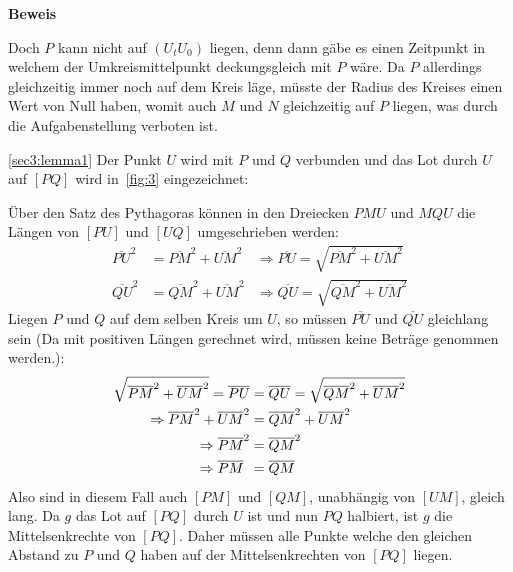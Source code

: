 \documentclass[10pt, a4paper, reqno]{amsart}
\makeatletter
\renewcommand\proofname{Beweis}
\renewenvironment{proof}[1][\proofname]{\par
\pushQED{\qed}%
\normalfont \topsep6\p@\@plus6\p@\relax
\trivlist
\item\relax
{\bfseries#1}\hspace\labelsep\ignorespaces
}{%
\popQED\endtrivlist\@endpefalse
}
\newenvironment{proof_thm}[1]{
\begin{proof}[\proofname~(#1)]}{\end{proof}}
\makeatother
\begin{document}
\begin{proof}
  Doch $P$ kann nicht auf $(U_tU_0)$ liegen, denn dann gäbe es
  einen Zeitpunkt in welchem der Umkreismittelpunkt deckungsgleich mit $P$ wäre.
  Da $P$ allerdings gleichzeitig immer noch auf dem Kreis läge, müsste der
  Radius des Kreises einen Wert von Null haben, womit auch $M$ und $N$
  gleichzeitig auf $P$ liegen, was durch die Aufgabenstellung verboten ist.
\end{proof}
\begin{proof_thm}{\autoref{sec3:lemma1}}
  Der Punkt $U$ wird mit $P$ und $Q$ verbunden und das Lot durch $U$ auf $[PQ]$
  wird in~\autoref{fig:3} eingezeichnet:
  \begin{figure}[h]
    \centering
    \caption{}
    \label{fig:3}
  \end{figure}
  Über den Satz des Pythagoras können in den Dreiecken $PMU$ und $MQU$ die Längen von $[PU]$ und $[UQ]$
  umgeschrieben werden:
  \begin{align*}
    \overline{PU}^2&=\overline{PM}^2+\overline{UM}^2 &\Rightarrow \overline{PU}=\sqrt{\overline{PM}^2+\overline{UM}^2}\\
    \overline{QU}^2&=\overline{QM}^2+\overline{UM}^2 &\Rightarrow \overline{QU}=\sqrt{\overline{QM}^2+\overline{UM}^2}
  \end{align*}
  Liegen $P$ und $Q$ auf dem selben Kreis um $U$, so müssen $\overline{PU}$ und
  $\overline{QU}$ gleichlang sein (Da mit positiven Längen gerechnet wird,
  müssen keine Beträge genommen werden.):
  \begin{align*}
    \sqrt{\overline{PM}^2+\overline{UM}^2} = \overline{PU} &= \overline{QU} = \sqrt{\overline{QM}^2+\overline{UM}^2}\\
    \Rightarrow\overline{PM}^2+\overline{UM}^2 &= \overline{QM}^2+\overline{UM}^2\\
    \Rightarrow\overline{PM}^2&=\overline{QM}^2\\
    \Rightarrow\overline{PM}\hphantom{{}^2}&=\overline{QM}
  \end{align*}
  Also sind in diesem Fall auch $[PM]$ und $[QM]$, unabhängig von $[UM]$, gleich
  lang. Da $g$ das Lot auf $[PQ]$ durch $U$ ist und nun $PQ$ halbiert, ist $g$
  die Mittelsenkrechte von $[PQ]$. Daher müssen alle Punkte welche den
  gleichen Abstand zu $P$ und $Q$ haben auf der Mittelsenkrechten von $[PQ]$
  liegen.
\end{proof_thm}
\end{document}
